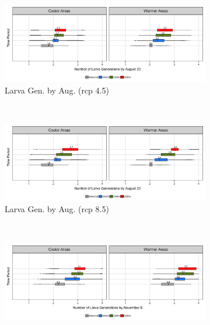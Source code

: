 \documentclass[12pt]{article}
\theoremstyle{plain}
\theoremstyle{definition}
\theoremstyle{definition}
\begin{document}
\begin{figure}[h!]
    \centering
    \begin{subfigure}[b]{0.45\textwidth}
        \includegraphics[width=\textwidth]{figures/Larva_Gen_Aug_rcp45}
        \caption{\small Larva Gen. by Aug. (rcp 4.5)}
        \label{fig:Larva_Gen_Aug_rcp45)}
    \end{subfigure}
    ~ %
    \begin{subfigure}[b]{0.45\textwidth}
        \includegraphics[width=\textwidth]{figures/Larva_Gen_Aug_rcp85}
        \caption{\small  Larva Gen. by Aug. (rcp 8.5)}
        \label{fig:Larva_Gen_Aug_rcp85}
    \end{subfigure}\\
    \vspace{.2in}
    \begin{subfigure}[b]{0.45\textwidth}
        \includegraphics[width=\textwidth]{figures/Larva_Gen_Nov_rcp45}

\end{subfigure}
\end{figure}
\end{document}
